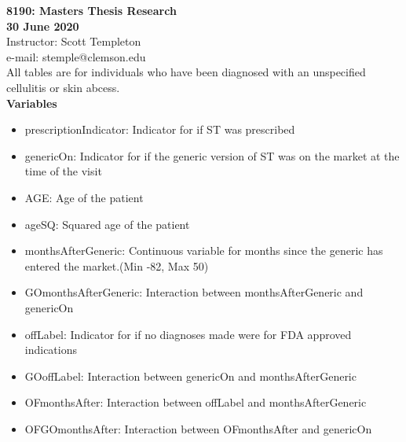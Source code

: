 
\let\counterwithout\relax
\let\counterwithin\relax
{}



\noindent \textbf{8190: Masters Thesis Research}\\
\noindent \textbf{30 June 2020}\\
\noindent Instructor: Scott Templeton \\
e-mail: stemple@clemson.edu\\

\noindent All tables are for individuals who have been diagnosed with an unspecified cellulitis or skin abcess.\\
\noindent \textbf{Variables}\\
\begin{itemize}
    \item prescriptionIndicator: Indicator for if ST was prescribed
    \item genericOn: Indicator for if the generic version of ST was on the market at the time of the visit
    \item AGE: Age of the patient
    \item ageSQ: Squared age of the patient
    \item monthsAfterGeneric: Continuous variable for months since the generic has entered the market.(Min -82, Max 50)
    \item GOmonthsAfterGeneric: Interaction between monthsAfterGeneric and genericOn
    \item offLabel: Indicator for if no diagnoses made were for FDA approved indications
    \item GOoffLabel: Interaction between genericOn and monthsAfterGeneric
    \item OFmonthsAfter: Interaction between offLabel and monthsAfterGeneric
    \item OFGOmonthsAfter: Interaction between OFmonthsAfter and genericOn
\end{itemize}
\begin{landscape}

\newpage

\newpage

\newpage

\newpage

\newpage

\newpage

\end{landscape}




